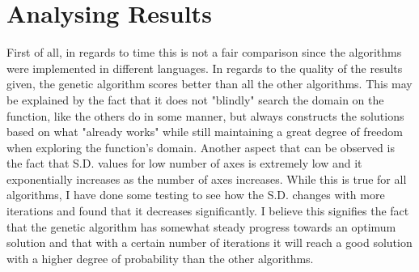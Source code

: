 \documentclass{report}
\begin{document}
\section*{Analysing Results}
First of all, in regards to time this is not a fair comparison since the algorithms were implemented in different languages. 
\newline
\newline
In regards to the quality of the results given, the genetic algorithm scores better than all the other algorithms. This may be explained by the fact that it does 
not "blindly" search the domain on the function, like the others do in some manner, but always constructs the solutions based on what "already works" while still maintaining a great degree of freedom when exploring the function's domain.
\newline
\newline
Another aspect that can be observed is the fact that S.D. values for low number of axes is extremely low and it exponentially increases as the number of axes increases. While this is true for all algorithms, I have done some testing to see how the S.D. changes with more iterations
and found that it decreases significantly. 
\newline
\newline
I believe this signifies the fact that the genetic algorithm has somewhat steady progress towards an optimum solution and that with a certain number of iterations it will reach a good solution with a higher degree of probability than the other algorithms.
\end{document}
